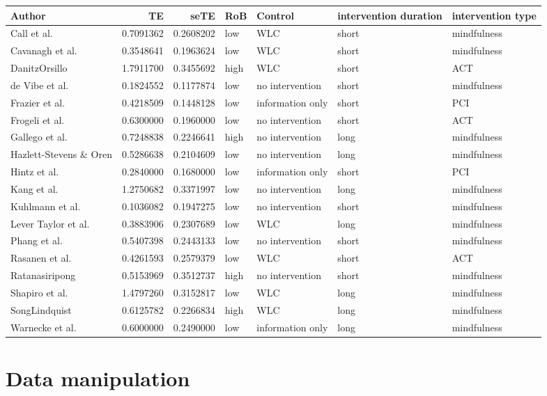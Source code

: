 \documentclass[]{book}
\theoremstyle{definition}
\theoremstyle{definition}
\theoremstyle{definition}
\theoremstyle{remark}
\begin{document}
\begin{tabular}{l|r|r|l|l|l|l}
\hline
Author & TE & seTE & RoB & Control & intervention duration & intervention type\\
\hline
Call et al. & 0.7091362 & 0.2608202 & low & WLC & short & mindfulness\\
\hline
Cavanagh et al. & 0.3548641 & 0.1963624 & low & WLC & short & mindfulness\\
\hline
DanitzOrsillo & 1.7911700 & 0.3455692 & high & WLC & short & ACT\\
\hline
de Vibe et al. & 0.1824552 & 0.1177874 & low & no intervention & short & mindfulness\\
\hline
Frazier et al. & 0.4218509 & 0.1448128 & low & information only & short & PCI\\
\hline
Frogeli et al. & 0.6300000 & 0.1960000 & low & no intervention & short & ACT\\
\hline
Gallego et al. & 0.7248838 & 0.2246641 & high & no intervention & long & mindfulness\\
\hline
Hazlett-Stevens \& Oren & 0.5286638 & 0.2104609 & low & no intervention & long & mindfulness\\
\hline
Hintz et al. & 0.2840000 & 0.1680000 & low & information only & short & PCI\\
\hline
Kang et al. & 1.2750682 & 0.3371997 & low & no intervention & long & mindfulness\\
\hline
Kuhlmann et al. & 0.1036082 & 0.1947275 & low & no intervention & short & mindfulness\\
\hline
Lever Taylor et al. & 0.3883906 & 0.2307689 & low & WLC & long & mindfulness\\
\hline
Phang et al. & 0.5407398 & 0.2443133 & low & no intervention & short & mindfulness\\
\hline
Rasanen et al. & 0.4261593 & 0.2579379 & low & WLC & short & ACT\\
\hline
Ratanasiripong & 0.5153969 & 0.3512737 & high & no intervention & short & mindfulness\\
\hline
Shapiro et al. & 1.4797260 & 0.3152817 & low & WLC & long & mindfulness\\
\hline
SongLindquist & 0.6125782 & 0.2266834 & high & WLC & long & mindfulness\\
\hline
Warnecke et al. & 0.6000000 & 0.2490000 & low & information only & long & mindfulness\\
\hline
\end{tabular}

\section{Data manipulation}\label{data-manipulation}
\end{document}
